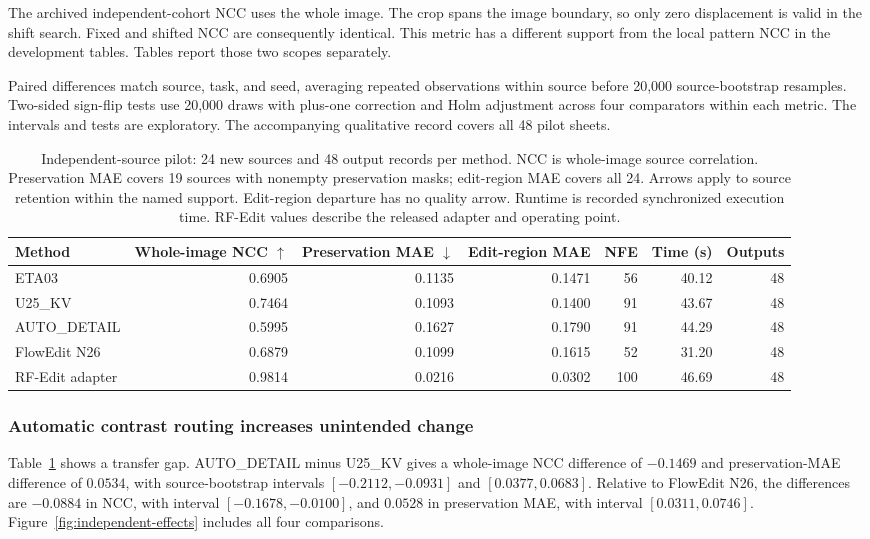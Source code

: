 The archived independent-cohort NCC uses the whole image. The crop spans the image boundary, so only zero displacement is valid in the shift search. Fixed and shifted NCC are consequently identical. This metric has a different support from the local pattern NCC in the development tables. Tables report those two scopes separately.

Paired differences match source, task, and seed, averaging repeated observations within source before 20,000 source-bootstrap resamples. Two-sided sign-flip tests use 20,000 draws with plus-one correction and Holm adjustment across four comparators within each metric. The intervals and tests are exploratory. The accompanying qualitative record covers all 48 pilot sheets.

\begin{table}[t]
\centering\small
\caption{Independent-source pilot: 24 new sources and 48 output records per method. NCC is whole-image source correlation. Preservation MAE covers 19 sources with nonempty preservation masks; edit-region MAE covers all 24. Arrows apply to source retention within the named support. Edit-region departure has no quality arrow. Runtime is recorded synchronized execution time. RF-Edit values describe the released adapter and operating point.}
\label{tab:independent}
\begin{tabular}{lrrrrrr}
\toprule
Method & Whole-image NCC $\uparrow$ & Preservation MAE $\downarrow$ & Edit-region MAE & NFE & Time (s) & Outputs\\
\midrule
ETA03 & 0.6905 & 0.1135 & 0.1471 & 56 & 40.12 & 48\\
U25\_KV & 0.7464 & 0.1093 & 0.1400 & 91 & 43.67 & 48\\
AUTO\_DETAIL & 0.5995 & 0.1627 & 0.1790 & 91 & 44.29 & 48\\
FlowEdit N26 & 0.6879 & 0.1099 & 0.1615 & 52 & 31.20 & 48\\
RF-Edit adapter & 0.9814 & 0.0216 & 0.0302 & 100 & 46.69 & 48\\
\bottomrule
\end{tabular}
\end{table}

\subsubsection{Automatic contrast routing increases unintended change}
Table~\ref{tab:independent} shows a transfer gap. AUTO\_DETAIL minus U25\_KV gives a whole-image NCC difference of $-0.1469$ and preservation-MAE difference of $0.0534$, with source-bootstrap intervals $[-0.2112,-0.0931]$ and $[0.0377,0.0683]$. Relative to FlowEdit N26, the differences are $-0.0884$ in NCC, with interval $[-0.1678,-0.0100]$, and $0.0528$ in preservation MAE, with interval $[0.0311,0.0746]$. Figure~\ref{fig:independent-effects} includes all four comparisons.

